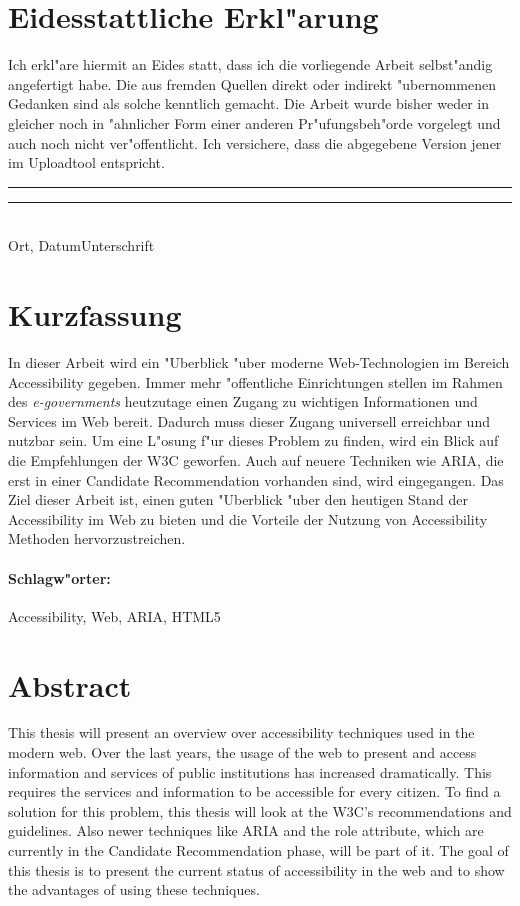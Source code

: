\documentclass[a4paper,bibtotoc,oneside]{scrbook}
\begin{document}
\newpage


\section*{Eidesstattliche Erkl"arung}\thispagestyle{empty}
\glqq Ich erkl"are hiermit an Eides statt, dass ich die vorliegende Arbeit selbst"andig angefertigt habe. 
Die aus fremden Quellen direkt oder indirekt "ubernommenen Gedanken sind als solche kenntlich gemacht. 
Die Arbeit wurde bisher weder in gleicher noch in "ahnlicher Form einer anderen Pr"ufungsbeh"orde vorgelegt
und auch noch nicht ver"offentlicht. Ich versichere, dass die abgegebene Version jener im Uploadtool entspricht.\grqq\\[5\baselineskip]
\rule{5cm}{0.2pt}\hfill\rule{5cm}{0.2pt}\\
\phantom{Datum }Ort, Datum\hfill Unterschrift\hspace{15mm}

\newpage


\section*{Kurzfassung}\thispagestyle{empty}
In dieser Arbeit wird ein "Uberblick "uber moderne Web-Technologien im Bereich
Accessibility gegeben. Immer mehr "offentliche Einrichtungen stellen im Rahmen des \emph{e-governments} heutzutage einen Zugang zu wichtigen Informationen und Services im Web bereit. Dadurch muss dieser Zugang universell erreichbar und nutzbar sein. Um eine L"osung f"ur dieses Problem zu finden, wird ein Blick auf die Empfehlungen der W3C geworfen. Auch auf neuere Techniken wie ARIA, die erst in einer Candidate Recommendation vorhanden sind, wird eingegangen. Das Ziel dieser Arbeit ist, einen guten "Uberblick "uber den heutigen Stand der Accessibility im Web zu bieten und die Vorteile der Nutzung von Accessibility Methoden hervorzustreichen. 
\vfill
\paragraph*{Schlagw"orter:} Accessibility, Web, ARIA, HTML5


\newpage

\section*{Abstract}\thispagestyle{empty}
This thesis will present an overview over accessibility techniques used in the
modern web. Over the last years, the usage of the web to present and
access information and services of public institutions has increased
dramatically. This requires the services and information to be accessible for
every citizen. To find a solution for this problem, this thesis will look at
the W3C's recommendations and guidelines. Also newer techniques like ARIA
and the role attribute, which are currently in the Candidate Recommendation
phase, will be part of it. The goal of this thesis is to present the current
status of accessibility in the web and to show the advantages of using these
techniques.
\vfill
\end{document}

